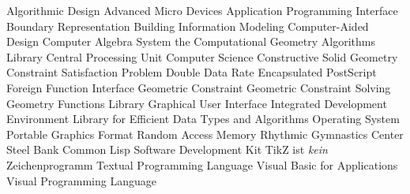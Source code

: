 \begin{acronym}[SO-DIMM]
       {Algorithmic Design}
      {Advanced Micro Devices}
      {Application Programming Interface}
    {Boundary Representation}
      {Building Information Modeling}
      {Computer-Aided Design}
      {Computer Algebra System}
     {the Computational Geometry Algorithms Library}
      {Central Processing Unit}
       {Computer Science}
      {Constructive Solid Geometry}
      {Constraint Satisfaction Problem}
      {Double Data Rate}
      {Encapsulated PostScript}
      {Foreign Function Interface}
       {Geometric Constraint}
      {Geometric Constraint Solving}
      {Geometry Functions Library}
      {Graphical User Interface}
      {Integrated Development Environment}
     {Library for Efficient Data Types and Algorithms}
       {Operating System}
      {Portable Graphics Format}
      {Random Access Memory}
      {Rhythmic Gymnastics Center}
     {Steel Bank Common Lisp}
      {Software Development Kit}
     {TikZ ist \textit{kein} Zeichenprogramm}
      {Textual Programming Language}
      {Visual Basic for Applications}
      {Visual Programming Language}
\end{acronym}
